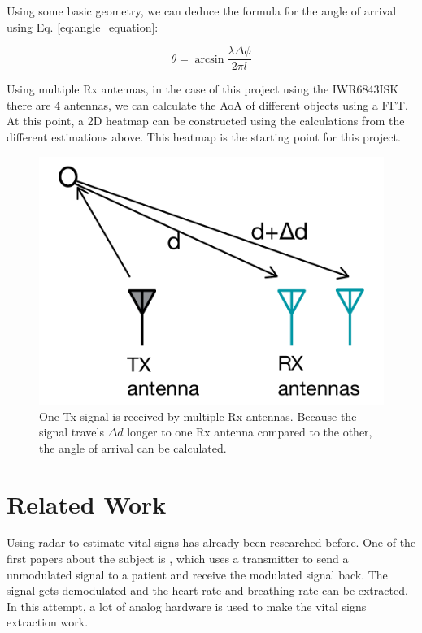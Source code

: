 Using some basic geometry, we can deduce the formula for the angle of arrival using Eq. \ref{eq:angle_equation}:

\begin{equation}
\theta = \arcsin{\frac{\lambda \Delta \phi}{2 \pi l}}
\label{eq:angle_equation_2}
\end{equation}

Using multiple Rx antennas, in the case of this project using the IWR6843ISK there are 4 antennas, we can calculate the AoA of different objects using a FFT. At this point, a 2D heatmap can be constructed using the calculations from the different estimations above. This heatmap is the starting point for this project.

\begin{figure}[t]
\centering
\includegraphics[width=.5\textwidth]{figures/background/angle_estimation.png}
\caption{One Tx signal is received by multiple Rx antennas. Because the signal travels $\Delta d$ longer to one Rx antenna compared to the other, the angle of arrival can be calculated.}
\label{fig:angle_estimation}
\end{figure}

\section{Related Work}
\label{sec:related_work}
Using radar to estimate vital signs has already been researched before. One of the first papers about the subject is \cite{li2009radar}, which uses a transmitter to send a unmodulated signal to a patient and receive the modulated signal back. The signal gets demodulated and the heart rate and breathing rate can be extracted. In this attempt, a lot of analog hardware is used to make the vital signs extraction work. 

